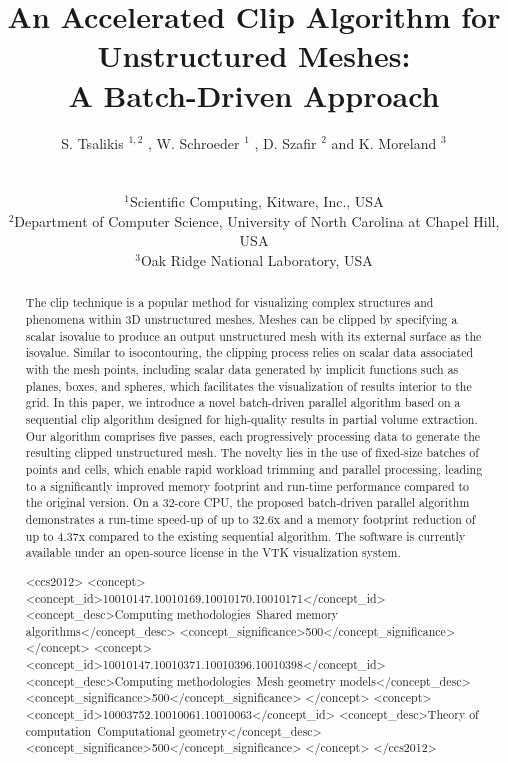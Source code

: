 \documentclass{egpubl}
\title{An Accelerated Clip Algorithm for Unstructured Meshes:\\ A Batch-Driven Approach}
\author
[
S. Tsalikis 
\& W. Schroeder
\& D. Szafir
\& K. Moreland
]
{\parbox{\textwidth}{\centering
S. Tsalikis $^{1,2}$
\orcid{0000-0001-5113-7195},
W. Schroeder $^{1}$
\orcid{0000-0003-3815-9386},
D. Szafir $^{2}$
\orcid{0000-0003-1848-7884}
and
K. Moreland $^{3}$
\orcid{0000-0002-7051-3288}
}
\\
{\parbox{\textwidth}{\centering
$^1$Scientific Computing, Kitware, Inc., USA\\
$^2$Department of Computer Science, University of North Carolina at Chapel Hill, USA\\
$^3$Oak Ridge National Laboratory, USA
}
}
}
\begin{document}

\maketitle
\begin{abstract}
The clip technique is a popular method for visualizing complex structures and phenomena within 3D unstructured meshes.
Meshes can be clipped by specifying a scalar isovalue to produce an output unstructured mesh with its external surface as the isovalue.
Similar to isocontouring, the clipping process relies on scalar data associated with the mesh points, including scalar data generated by implicit functions such as planes, boxes, and spheres, which facilitates the visualization of results interior to the grid.
In this paper, we introduce a novel batch-driven parallel algorithm based on a sequential clip algorithm designed for high-quality results in partial volume extraction. Our algorithm comprises five passes, each progressively processing data to generate the resulting clipped unstructured mesh. The novelty lies in the use of fixed-size batches of points and cells, which enable rapid workload trimming and parallel processing, leading to a significantly improved memory footprint and run-time performance compared to the original version.
On a 32-core CPU, the proposed batch-driven parallel algorithm demonstrates a run-time speed-up of up to 32.6x and a memory footprint reduction of up to 4.37x compared to the existing sequential algorithm.  The software is currently available under an open-source license in the VTK visualization system.

   
\begin{CCSXML}
<ccs2012>
<concept>
<concept_id>10010147.10010169.10010170.10010171</concept_id>
<concept_desc>Computing methodologies~Shared memory algorithms</concept_desc>
<concept_significance>500</concept_significance>
</concept>
<concept>
<concept_id>10010147.10010371.10010396.10010398</concept_id>
<concept_desc>Computing methodologies~Mesh geometry models</concept_desc>
<concept_significance>500</concept_significance>
</concept>
<concept>
<concept_id>10003752.10010061.10010063</concept_id>
<concept_desc>Theory of computation~Computational geometry</concept_desc>
<concept_significance>500</concept_significance>
</concept>
</ccs2012>
\end{CCSXML}


\end{abstract}
\end{document}
